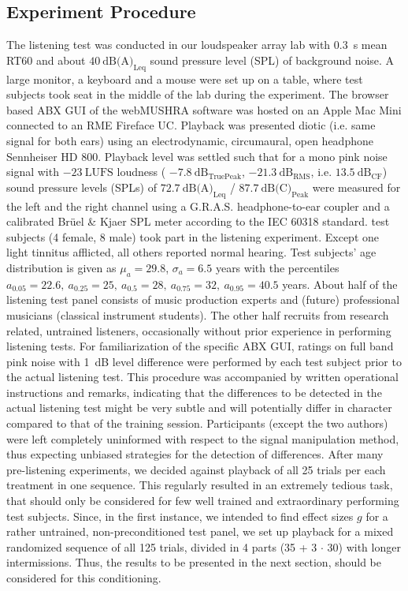 \subsection{Experiment Procedure}
The listening test was conducted in our loudspeaker array lab with 0.3~s mean RT60
and about $40~\text{dB(A)}_\text{Leq}$
sound pressure level (SPL) of background noise.
%
A large monitor, a keyboard and a mouse were set up on a table, where test subjects
took seat in the middle of the lab during the experiment.
%
The browser based ABX GUI of the webMUSHRA software was hosted on an Apple Mac Mini
connected to an RME Fireface UC.
%
\NewL Playback was presented diotic (i.e. same signal for both ears) using
an electrodynamic, circumaural, open headphone Sennheiser HD 800.
%
Playback level was settled such that for a mono pink noise signal with
$-23~\text{LUFS}$ loudness
(%
$-7.8~\text{dB}_\text{TruePeak}$,
$-21.3~\text{dB}_\text{RMS}$, i.e.
$13.5~\text{dB}_\text{CF}$)
sound pressure levels (SPLs) of
$72.7~\text{dB(A)}_\text{Leq}$ / $87.7~\text{dB(C)}_\text{Peak}$
were measured for the left and the right channel using a G.R.A.S.
headphone-to-ear coupler and a calibrated Br\"uel \& Kjaer SPL meter according
to the IEC 60318 standard.
%
 test subjects (4 female, 8 male) took part in the listening experiment.
Except one light tinnitus afflicted, all others reported normal hearing.
%
Test subjects' age distribution is given as $\mu_a=29.8$, $\sigma_a=6.5$ years with the
percentiles $a_{0.05}=22.6,~a_{0.25}=25,~a_{0.5}=28,~a_{0.75}=32,~a_{0.95}=40.5$ years.
%
About half of the listening test panel consists of
music production experts and (future) professional musicians
(classical instrument students).
%
The other half recruits from research related, untrained listeners,
occasionally without prior experience in performing listening tests.
%
\NewL For familiarization of the specific ABX GUI, ratings on
full band pink noise with 1~dB level difference were performed by each
test subject prior to the actual listening test.
%
This procedure was accompanied by written operational instructions and remarks,
indicating that the differences to be detected in the actual listening test might be
very subtle and will potentially differ in character compared to that of the training
session.
%
Participants (except the two authors) were left completely uninformed
with respect to the signal manipulation method, thus expecting unbiased
strategies for the detection of differences.
%
\NewL After many pre-listening experiments, we decided against playback of all
25 trials per each treatment in one sequence.
This regularly resulted in an extremely tedious task, that should only be
considered for few well trained and extraordinary performing test subjects.
%
Since, in the first instance, we intended to find effect sizes $g$ for a rather
untrained, non-preconditioned test panel, we set up playback for a mixed
randomized sequence of all 125 trials, divided in 4 parts
(35 + 3 $\cdot$ 30) with longer intermissions.
%
Thus, the results to be presented in the next section, should be
considered for this conditioning.
%
%
%
